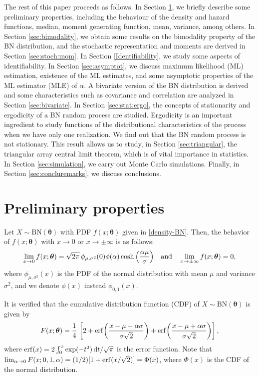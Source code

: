 \documentclass[12pt]{article}
\theoremstyle{definition}
\begin{document}
The rest of this paper proceeds as follows. In Section \ref{sec:pre:prop}, we briefly describe some preliminary properties, including the behaviour of the density and hazard functions, median,  moment generating function, mean, variance, among others. In Section \ref{sec:bimodality}, we obtain some results on the bimodality property of the BN distribution, and the stochastic representation and moments are derived in Section \ref{sec:stoch:mom}. In Section \ref{Identifiability}, we study some aspects of identifiability. In Section \ref{sec:asymptot}, we discuss maximum likelihood (ML) estimation, existence of the ML estimates, and some asymptotic properties of the ML estimator (MLE) of $\alpha$. A bivariate version of the BN distribution is derived and some characteristics such as covariance and correlation are analyzed in Section \ref{sec:bivariate}. In Section \ref{sec:stat:ergo}, the concepts of stationarity and ergodicity of a BN random process are studied. Ergodicity is an important ingredient to study functions of the distributional characteristics of the process when we have only one realization. We find out that the BN random process is not stationary. This result allows us to study, in Section \ref{sec:triangular}, the triangular array central limit theorem, which is of vital importance in statistics. In Section \ref{sec:simulation}, we carry out Monte Carlo simulations. Finally, in Section \ref{sec:concluremarks}, we discuss conclusions.



\section{Preliminary properties}\label{sec:pre:prop}
Let $X\sim \text{BN}(\boldsymbol{\theta})$ with PDF $f(x;\boldsymbol{\theta})$ given in \eqref{density-BN}. Then, the behavior of $f(x;\boldsymbol{\theta})$ with $x\to 0$ or $x \to \pm\infty$ is as follows:
\begin{align}\label{limits-density}
\lim_{x\to 0} f(x;\boldsymbol{\theta})
=
\sqrt{2\pi}\, 
\phi_{\mu,\sigma^2}(0) 
\phi(\alpha) 
\cosh\Big({\alpha\mu\over\sigma}\Big)
\quad \text{and} \quad
\lim_{x\to \pm\infty} f(x;\boldsymbol{\theta})=0,
\end{align}
where $\phi_{\mu,\sigma^2}(x)$ is the PDF of the normal distribution with mean $\mu$ and variance $\sigma^2$, and we denote $\phi(x)$ instead $\phi_{0,1}(x)$.

It is verified that the cumulative distribution function (CDF) of $X\sim \text{BN}(\boldsymbol{\theta})$ is given by
\begin{align}\label{CDF-Bigaussian}
F(x;\boldsymbol{\theta})
=
{1\over 4}\, 
\left[2+{\rm erf}\biggl({x-\mu-\alpha\sigma\over \sigma\sqrt{2}}\biggr)
+
{\rm erf}\biggl({x-\mu+\alpha\sigma\over \sigma\sqrt{2} }\biggr)\right],
\end{align}
where ${\rm erf}(x)=2\int_0^{x} \exp(-t^2)\, {\rm d}t/\sqrt{\pi}$ is the error function. Note that $\lim_{\alpha\to 0}F(x;0,1,\alpha)=(1/2)[1+{\rm erf}({x/\sqrt{2}})]=\Phi(x)$, where $\Phi(x)$ is the CDF of the normal distribution.
\end{document}
